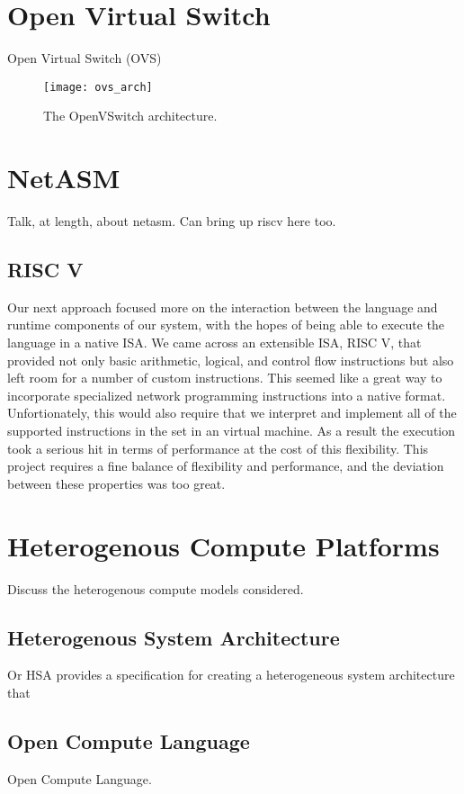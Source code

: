 \section{Open Virtual Switch}
\label{related:ovs}
Open Virtual Switch (OVS)
\begin{figure}[h]
\centering
\texttt{[image: ovs\_arch]}
\caption{The OpenVSwitch architecture.}
\label{related:ovs_arch}
\end{figure}

\section{NetASM}
\label{related:netasm}
Talk, at length, about netasm. Can bring up riscv here too.

\subsection{RISC V}
Our next approach focused more on the interaction between the language and
runtime components of our system, with the hopes of being able to execute
the language in a native ISA. We came across an extensible ISA, RISC V, that
provided not only basic arithmetic, logical, and control flow instructions but
also left room for a number of custom instructions. This seemed like a great
way to incorporate specialized network programming instructions into a native
format. Unfortionately, this would also require that we interpret and implement
all of the supported instructions in the set in an virtual machine. As a result
the execution took a serious hit in terms of performance at the cost of this
flexibility. This project requires a fine balance of flexibility and
performance, and the deviation between these properties was too great.

\section{Heterogenous Compute Platforms}
\label{related:hcp}
Discuss the heterogenous compute models considered.

\subsection{Heterogenous System Architecture}
\label{related:hcp:hsa}
Or HSA \cite{hsa} provides a specification for creating a heterogeneous
system architecture that

\subsection{Open Compute Language}
\label{related:hcp:ocl}
Open Compute Language.

